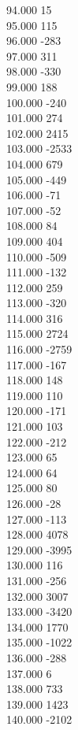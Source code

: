 { 94.000	15 \\
 95.000	115 \\
 96.000	-283 \\
 97.000	311 \\
 98.000	-330 \\
 99.000	188 \\
 100.000	-240 \\
 101.000	274 \\
 102.000	2415 \\
 103.000	-2533 \\
 104.000	679 \\
 105.000	-449 \\
 106.000	-71 \\
 107.000	-52 \\
 108.000	84 \\
 109.000	404 \\
 110.000	-509 \\
 111.000	-132 \\
 112.000	259 \\
 113.000	-320 \\
 114.000	316 \\
 115.000	2724 \\
 116.000	-2759 \\
 117.000	-167 \\
 118.000	148 \\
 119.000	110 \\
 120.000	-171 \\
 121.000	103 \\
 122.000	-212 \\
 123.000	65 \\
 124.000	64 \\
 125.000	80 \\
 126.000	-28 \\
 127.000	-113 \\
 128.000	4078 \\
 129.000	-3995 \\
 130.000	116 \\
 131.000	-256 \\
 132.000	3007 \\
 133.000	-3420 \\
 134.000	1770 \\
 135.000	-1022 \\
 136.000	-288 \\
 137.000	6 \\
 138.000	733 \\
 139.000	1423 \\
 140.000	-2102 \\
}
